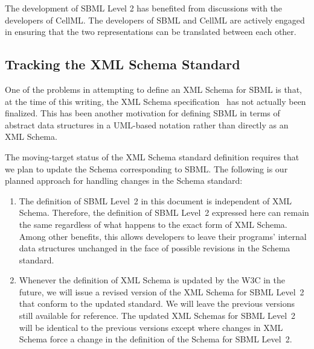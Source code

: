 \documentclass[10pt]{cekarticle}
\begin{document}
The development of SBML Level 2 has benefited from discussions
with the developers of CellML. The developers of SBML and CellML
are actively engaged in ensuring that the two representations can
be translated between each other.

\subsection{Tracking the XML Schema Standard}
\label{sec:tracking-xml}

One of the problems in attempting to define an XML Schema for SBML is that,
at the time of this writing, the XML Schema
specification~\citep{biron:2000,thompson:2000} has not actually been
finalized.  This has been another motivation for defining SBML in terms of
abstract data structures in a UML-based notation rather than directly as an
XML Schema.

The moving-target status of the XML Schema standard definition requires
that we plan to update the Schema corresponding to SBML.  The following
is our planned approach for handling changes in the Schema standard:
\begin{enumerate}

\item The definition of SBML Level~2 in this document is
independent of XML
  Schema.  Therefore, the definition of SBML Level~2 expressed here can
  remain the same regardless of what happens to the exact form of XML
  Schema.  Among other benefits, this allows developers to leave their
  programs' internal data structures unchanged in the face of possible
  revisions in the Schema standard.

%
\item Whenever the definition of XML Schema is updated by the W3C in the
  future, we will issue a revised version of the XML Schema for SBML
  Level~2 that conform to the updated standard.  We will leave the previous
  versions still available for reference.  The updated XML Schemas for SBML
  Level~2 will be identical to the previous versions except where changes
  in XML Schema force a change in the definition of the Schema for SBML
  Level~2.

\end{enumerate}
\end{document}
